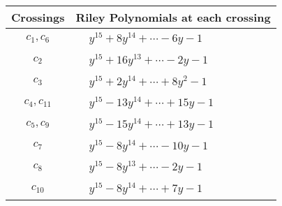 \documentclass[1p]{elsarticle_modified}
\theoremstyle{definition}
\begin{document}
\begin{tabular}{m{50pt}|m{274pt}}
Crossings & \hspace{64pt}Riley Polynomials at each crossing \\
\hline $$\begin{aligned}c_{1},c_{6}\end{aligned}$$&$\begin{aligned}
&y^{15}+8 y^{14}+\cdots-6 y-1
\end{aligned}$\\
\hline $$\begin{aligned}c_{2}\end{aligned}$$&$\begin{aligned}
&y^{15}+16 y^{13}+\cdots-2 y-1
\end{aligned}$\\
\hline $$\begin{aligned}c_{3}\end{aligned}$$&$\begin{aligned}
&y^{15}+2 y^{14}+\cdots+8 y^2-1
\end{aligned}$\\
\hline $$\begin{aligned}c_{4},c_{11}\end{aligned}$$&$\begin{aligned}
&y^{15}-13 y^{14}+\cdots+15 y-1
\end{aligned}$\\
\hline $$\begin{aligned}c_{5},c_{9}\end{aligned}$$&$\begin{aligned}
&y^{15}-15 y^{14}+\cdots+13 y-1
\end{aligned}$\\
\hline $$\begin{aligned}c_{7}\end{aligned}$$&$\begin{aligned}
&y^{15}-8 y^{14}+\cdots-10 y-1
\end{aligned}$\\
\hline $$\begin{aligned}c_{8}\end{aligned}$$&$\begin{aligned}
&y^{15}-8 y^{13}+\cdots-2 y-1
\end{aligned}$\\
\hline $$\begin{aligned}c_{10}\end{aligned}$$&$\begin{aligned}
&y^{15}-8 y^{14}+\cdots+7 y-1
\end{aligned}$\\
\hline
\end{tabular}\\~\\
\end{document}
